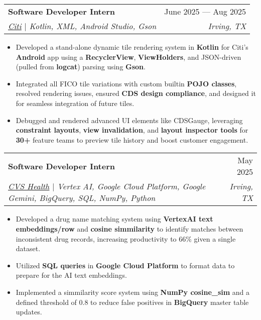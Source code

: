\documentclass[letterpaper,11pt]{article}
\makeatletter
\newcommand{\resumeItem}[1]{
  \item\small{
    {#1 \vspace{-2pt}}
  }
}
\newcommand{\resumeSubheading}[4]{
  \vspace{-2pt}\item
    \begin{tabular*}{0.97\textwidth}[t]{l@{\extracolsep{\fill}}r}
      \textbf{#1} & #2 \\
      \textit{\small#3} & \textit{\small #4} \\
    \end{tabular*}\vspace{-7pt}
}
\newcommand{\resumeItemListStart}{\begin{itemize}}
\newcommand{\resumeItemListEnd}{\end{itemize}\vspace{-5pt}}
\makeatother
\begin{document}
    \resumeSubheading
      {Software Developer Intern}{June 2025 — Aug 2025}
      {\href{https://www.citigroup.com/global}{\underline{Citi}} $|$ \textit{Kotlin}, \textit{XML}, \textit{Android Studio}, \textit{Gson}}{Irving, TX}
      \resumeItemListStart
        \resumeItem{Developed a stand-alone dynamic tile rendering system in {\textbf{Kotlin}} for Citi's {\textbf{Android}} app using a {\textbf{RecyclerView}}, {\textbf{ViewHolders}}, and JSON-driven (pulled from {\textbf{logcat}}) parsing using {\textbf{Gson}}.}
        \resumeItem{Integrated all FICO tile variations with custom builtin {\textbf{POJO classes}}, resolved rendering issues, ensured {\textbf{CDS design compliance}}, and designed it for seamless integration of future tiles.}
        \resumeItem{Debugged and rendered advanced UI elements like CDSGauge, leveraging {\textbf{constraint layouts}}, {\textbf{view invalidation}}, and {\textbf{layout inspector tools}} for {\textbf{30+}} feature teams to preview tile history and boost customer engagement.}
    \resumeItemListEnd

    \resumeSubheading
      {Software Developer Intern}{May 2025}
      {\href{https://www.cvshealth.com/}{\underline{CVS Health}} $|$ \textit{Vertex AI}, \textit{Google Cloud Platform}, \textit{Google Gemini}, \textit{BigQuery}, \textit{SQL}, \textit{NumPy}, \textit{Python}}{Irving, TX}
      \resumeItemListStart
        \resumeItem{Developed a drug name matching system using {\textbf{VertexAI text embeddings/row}} and {\textbf{cosine simmilarity}} to identify matches between inconsistent drug records, increasing productivity to 66\% given a single dataset.}
        \resumeItem{Utilized {\textbf{SQL queries}} in {\textbf{Google Cloud Platform}} to format data to prepare for the AI text embeddings.}
        \resumeItem{Implemented a simmilarity score system using {\textbf{NumPy cosine\_sim}} and a defined threshold of 0.8 to reduce false positives in {\textbf{BigQuery}} master table updates.}
    \resumeItemListEnd

\end{document}
